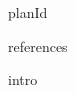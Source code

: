 \label{sec_planId}

\downsection
  {planId}
\upsection

\label{sec_references}

\downsection
  {references}
\upsection

\label{sec_intro}

\downsection
  {intro}
\upsection



